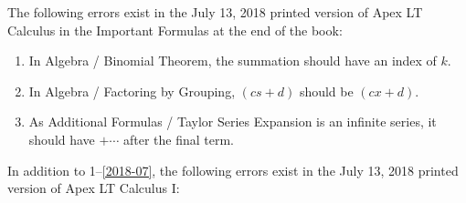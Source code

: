 \documentclass{amsart}
\begin{document}

The following errors exist in the July 13, 2018 printed version of Apex LT Calculus in the Important Formulas at the end of the book:
\begin{enumerate}
\item In Algebra / Binomial Theorem, the summation should have an index of $k$.
\item In Algebra / Factoring by Grouping, $(cs+d)$ should be $(cx+d)$.
\item As Additional Formulas / Taylor Series Expansion is an infinite series, it should have $+\dotsb$ after the final term.
\label{2018-07}
\end{enumerate}\bigskip

In addition to 1--\ref{2018-07}, the following errors exist in the July 13, 2018 printed version of Apex LT Calculus I:
\end{document}
